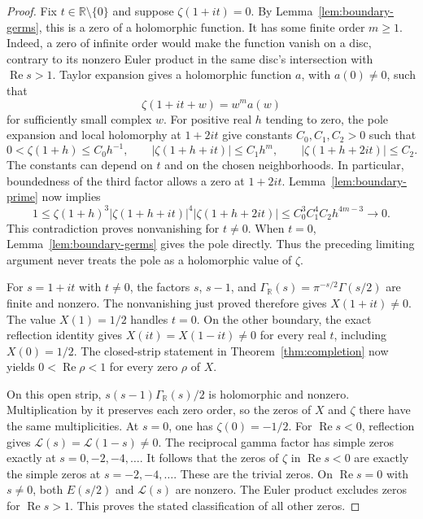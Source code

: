 \documentclass[11pt]{article}
\theoremstyle{definition}
\theoremstyle{remark}
\numberwithin{equation}{section}
\newcommand{\R}{\mathbb R}
\begin{document}
\begin{proof}
Fix $t\in\R\setminus\{0\}$ and suppose $\zeta(1+it)=0$.
By Lemma~\ref{lem:boundary-germs}, this is a zero of a holomorphic
function.  It has some finite order $m\geq1$.
Indeed, a zero of infinite order would make the function vanish on a
disc, contrary to its nonzero Euler product in the same disc's
intersection with $\operatorname{Re}s>1$.
Taylor expansion gives a holomorphic function $a$, with $a(0)\ne0$,
such that
\[
 \zeta(1+it+w)=w^m a(w)
\]
for sufficiently small complex $w$.
For positive real $h$ tending to zero, the pole expansion and local
holomorphy at $1+2it$ give constants $C_0,C_1,C_2>0$ such that
\[
 0<\zeta(1+h)\leq C_0h^{-1},\qquad
 |\zeta(1+h+it)|\leq C_1h^m,\qquad
 |\zeta(1+h+2it)|\leq C_2.
\]
The constants can depend on $t$ and on the chosen neighborhoods.
In particular, boundedness of the third factor allows a zero at $1+2it$.
Lemma~\ref{lem:boundary-prime} now implies
\[
 1\leq\zeta(1+h)^3|\zeta(1+h+it)|^4|\zeta(1+h+2it)|
 \leq C_0^3C_1^4C_2 h^{4m-3}\longrightarrow0.
\]
This contradiction proves nonvanishing for $t\ne0$.
When $t=0$, Lemma~\ref{lem:boundary-germs} gives the pole directly.
Thus the preceding limiting argument never treats the pole as a
holomorphic value of $\zeta$.

For $s=1+it$ with $t\ne0$, the factors $s$, $s-1$, and
$\Gamma_{\R}(s)=\pi^{-s/2}\Gamma(s/2)$ are finite and nonzero.
The nonvanishing just proved therefore gives $X(1+it)\ne0$.
The value $X(1)=1/2$ handles $t=0$.
On the other boundary, the exact reflection identity gives
$X(it)=X(1-it)\ne0$ for every real $t$, including $X(0)=1/2$.
The closed-strip statement in Theorem~\ref{thm:completion} now yields
$0<\operatorname{Re}\rho<1$ for every zero $\rho$ of $X$.

On this open strip, $s(s-1)\Gamma_{\R}(s)/2$ is holomorphic and
nonzero.  Multiplication by it preserves each zero order, so the zeros
of $X$ and $\zeta$ there have the same multiplicities.
At $s=0$, one has $\zeta(0)=-1/2$.
For $\operatorname{Re}s<0$, reflection gives
$\mathcal L(s)=\mathcal L(1-s)\ne0$.
The reciprocal gamma factor has simple zeros exactly at
$s=0,-2,-4,\ldots$.
It follows that the zeros of $\zeta$ in $\operatorname{Re}s<0$ are
exactly the simple zeros at $s=-2,-4,\ldots$.
These are the trivial zeros.
On $\operatorname{Re}s=0$ with $s\ne0$, both $E(s/2)$ and
$\mathcal L(s)$ are nonzero.  The Euler product excludes zeros for
$\operatorname{Re}s>1$.
This proves the stated classification of all other zeros.


\end{proof}
\end{document}
